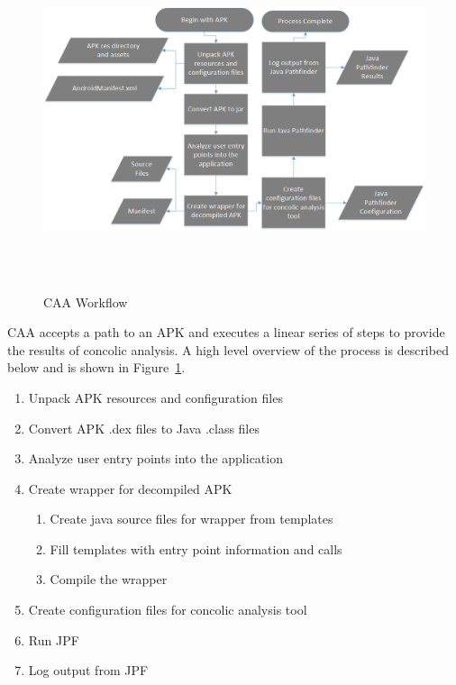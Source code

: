 \documentclass[conference]{IEEEtran}
\begin{document}
\begin{figure}[ht!]
\centering
\includegraphics[width=14cm,height=10cm,keepaspectratio]{images/workflow_grey.png}
\caption{CAA Workflow}
\label{fig:workflow}
\end{figure}


CAA accepts a path to an APK and executes a linear series of steps to provide the results of concolic analysis.  A high level overview of the process is described below and is shown in Figure~\ref{fig:workflow}.

\begin{enumerate}

 \item Unpack APK resources and configuration files
 \item Convert APK .dex files to Java .class files
 \item Analyze user entry points into the application
 \item Create wrapper for decompiled APK
 \begin{enumerate}
 	\item Create java source files for wrapper from templates
 	\item Fill templates with entry point information and calls
 	\item Compile the wrapper
 \end{enumerate}
 \item Create configuration files for concolic analysis tool
 \item Run JPF
 \item Log output from JPF
 \end{enumerate}
\end{document}
